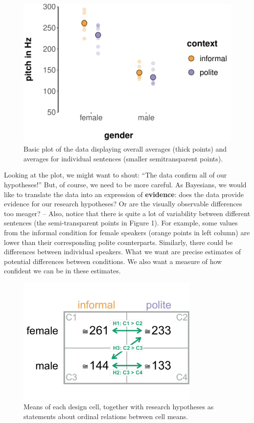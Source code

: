 \documentclass[nobib]{tufte-handout}
\begin{document}
\begin{figure}[t]
  \centering
    \includegraphics[width = \textwidth]{pics/basic_data_plot.pdf}
    \caption{Basic plot of the data displaying overall averages (thick points) and averages for individual sentences (smaller semitransparent points).}
     \label{fig:BasicPlotData_data}
\end{figure}


Looking at the plot, we might want to shout: ``The data confirm all of our
hypotheses!'' But, of course, we need to be more careful. As Bayesians, we would like to
translate the data into an expression of \textbf{evidence}: does the data provide evidence for
our research hypotheses? Or are the visually observable differences too meager? -- Also, notice that
there is quite a lot of variability between different sentences (the semi-transparent points in Figure 1).
For example, some values from the informal condition for female speakers (orange points in left
column) are lower than their corresponding polite counterparts. Similarly, there could be differences between individual speakers. What we want are precise
estimates of potential differences between conditions. We also want a measure of how confident we can be in these estimates.

\begin{figure}[h]
  \centering
    \includegraphics[width = 0.8\textwidth]{pics/table_mean_hypotheses.pdf}
    \caption{Means of each design cell, together with research hypotheses as statements about ordinal relations between cell means.}
    \label{fig:BasicPlotData_table}
\end{figure}
\end{document}
